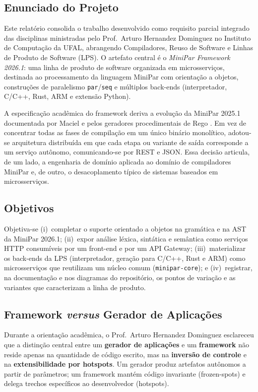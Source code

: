 \documentclass[12pt]{article}
\begin{document}
\subsection{Enunciado do Projeto}
Este relatório consolida o trabalho desenvolvido como requisito parcial integrado das disciplinas ministradas pelo Prof.\ Arturo Hernandez Dominguez no Instituto de Computação da UFAL, abrangendo Compiladores, Reuso de Software e Linhas de Produto de Software (LPS). O artefato central é o \emph{MiniPar Framework 2026.1}: uma linha de produto de software organizada em microsserviços, destinada ao processamento da linguagem MiniPar com orientação a objetos, construções de paralelismo \texttt{par}/\texttt{seq} e múltiplos back-ends (interpretador, C/C++, Rust, ARM e extensão Python).

A especificação acadêmica do framework \cite{minipar2026} deriva a evolução da MiniPar 2025.1 documentada por Maciel \cite{maciel2025} e pelos geradores procedimentais de Rego \cite{rego2025}. Em vez de concentrar todas as fases de compilação em um único binário monolítico, adotou-se arquitetura distribuída em que cada etapa ou variante de saída corresponde a um serviço autônomo, comunicando-se por REST e JSON. Essa decisão articula, de um lado, a engenharia de domínio aplicada ao domínio de compiladores MiniPar e, de outro, o desacoplamento típico de sistemas baseados em microsserviços.

\subsection{Objetivos}
Objetiva-se (i)~completar o suporte orientado a objetos na gramática e na AST da MiniPar 2026.1; (ii)~expor análise léxica, sintática e semântica como serviços HTTP consumíveis por um front-end e por um API Gateway; (iii)~materializar os back-ends da LPS (interpretador, geração para C/C++, Rust e ARM) como microsserviços que reutilizam um núcleo comum (\texttt{minipar-core}); e (iv)~registrar, na documentação e nos diagramas do repositório, os pontos de variação e as variantes que caracterizam a linha de produto.

\subsection{Framework \emph{versus} Gerador de Aplicações}

Durante a orientação acadêmica, o Prof.\ Arturo Hernandez Dominguez esclareceu que a distinção central entre um \textbf{gerador de aplicações} e um \textbf{framework} não reside apenas na quantidade de código escrito, mas na \textbf{inversão de controle} e na \textbf{extensibilidade por hotspots}. Um gerador produz artefatos autônomos a partir de parâmetros; um framework mantém código invariante (frozen-spots) e delega trechos específicos ao desenvolvedor (hotspots).
\end{document}
